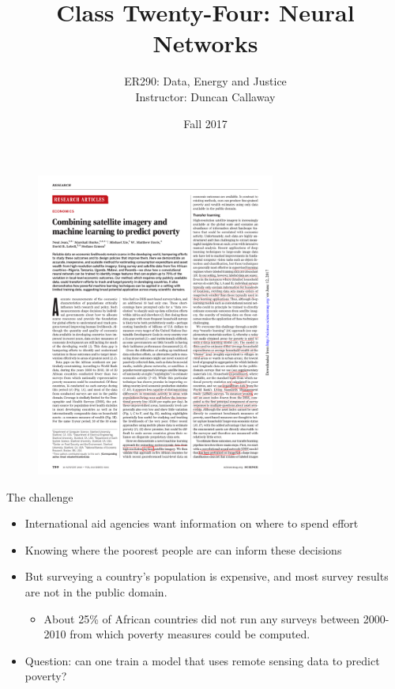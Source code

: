 \documentclass[mathserif]{beamer}
\title{Class Twenty-Four: Neural Networks}
\author{{ER290: Data, Energy and Justice\\  Instructor: Duncan Callaway} \\
}
\institute{University of California, Berkeley}
\date{Fall 2017}
\begin{document}
\frame{
  \titlepage
}


\begin{frame}{}
\begin{figure}
\includegraphics[width=0.7\textwidth]{jean_header}
\caption*{}
\end{figure}
\end{frame}

\begin{frame}{The challenge}

\begin{itemize}
\item International aid agencies want information on where to spend effort
\item Knowing where the poorest people are can inform these decisions
\item But surveying a country's population is expensive, and most survey results are not in the public domain.  
\begin{itemize}
\item About 25\% of African countries did not run any surveys between 2000-2010 from which poverty measures could be computed. 
\end{itemize}
\item Question: can one train a model that uses remote sensing data to predict poverty?
\end{itemize}

\end{frame}
\end{document}
